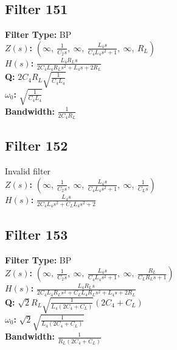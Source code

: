 \documentclass{article}
\begin{document}
\subsection*{Filter 151}
\textbf{Filter Type:} BP \\ 
\textbf{$Z(s)$:} $\left( \infty, \  \frac{1}{C_{2} s}, \  \infty, \  \frac{L_{4} s}{C_{4} L_{4} s^{2} + 1}, \  \infty, \  R_{L}\right)$ \\ 
\textbf{$H(s)$:} $\frac{L_{4} R_{L} s}{2 C_{4} L_{4} R_{L} s^{2} + L_{4} s + 2 R_{L}}$ \\ 
\textbf{Q:} $2 C_{4} R_{L} \sqrt{\frac{1}{C_{4} L_{4}}}$ \\ 
\textbf{$\omega_0$:} $\sqrt{\frac{1}{C_{4} L_{4}}}$ \\ 
\textbf{Bandwidth:} $\frac{1}{2 C_{4} R_{L}}$ \\ 
\subsection*{Filter 152}
Invalid filter \\ 
\textbf{$Z(s)$:} $\left( \infty, \  \frac{1}{C_{2} s}, \  \infty, \  \frac{L_{4} s}{C_{4} L_{4} s^{2} + 1}, \  \infty, \  \frac{1}{C_{L} s}\right)$ \\ 
\textbf{$H(s)$:} $\frac{L_{4} s}{2 C_{4} L_{4} s^{2} + C_{L} L_{4} s^{2} + 2}$ \\ 
\subsection*{Filter 153}
\textbf{Filter Type:} BP \\ 
\textbf{$Z(s)$:} $\left( \infty, \  \frac{1}{C_{2} s}, \  \infty, \  \frac{L_{4} s}{C_{4} L_{4} s^{2} + 1}, \  \infty, \  \frac{R_{L}}{C_{L} R_{L} s + 1}\right)$ \\ 
\textbf{$H(s)$:} $\frac{L_{4} R_{L} s}{2 C_{4} L_{4} R_{L} s^{2} + C_{L} L_{4} R_{L} s^{2} + L_{4} s + 2 R_{L}}$ \\ 
\textbf{Q:} $\sqrt{2} R_{L} \sqrt{\frac{1}{L_{4} \left(2 C_{4} + C_{L}\right)}} \left(2 C_{4} + C_{L}\right)$ \\ 
\textbf{$\omega_0$:} $\sqrt{2} \sqrt{\frac{1}{L_{4} \left(2 C_{4} + C_{L}\right)}}$ \\ 
\textbf{Bandwidth:} $\frac{1}{R_{L} \left(2 C_{4} + C_{L}\right)}$ \\ 
\end{document}
